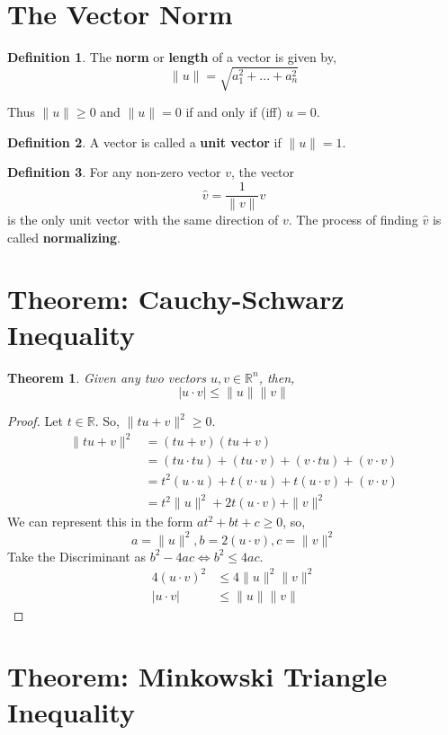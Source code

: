 \documentclass{report}
\newtheorem{_thm}{Theorem}
\theoremstyle{definition}
\newtheorem{_def}{Definition}
\begin{document}
\section{The Vector Norm}

\begin{_def}
The \textbf{norm} or \textbf{length} of a vector is given by,
\[\|u\|=\sqrt{a^2_1+...+a^2_n}\]
\end{_def}

Thus \(\|u\|\geq 0\) and \(\|u\|=0\) if and only if (iff) \(u=0\).

\begin{_def}
A vector is called a \textbf{unit vector} if \(\|u\|=1\).
\end{_def}

\begin{_def}
For any non-zero vector \(v\), the vector 
\[\hat{v}=\frac{1}{\|v\|} v\]
is the only unit vector with the same direction of $v$.
The process of finding \(\hat{v}\) is called \textbf{normalizing}.
\end{_def}

\section{Theorem: Cauchy-Schwarz Inequality}

\begin{_thm}
Given any two vectors \(u,v\in \mathbb{R}^n\), then,
\[|u\cdot v|\leq \|u\|\|v\|\]
\end{_thm}

\begin{proof}
Let \(t\in \mathbb{R}\). So, \(\|tu+v\|^2\geq 0\).
\begin{align*}
\|tu+v\|^2 &= (tu+v)(tu+v) \\
&= (tu\cdot tu)+(tu\cdot v)+(v\cdot tu)+(v\cdot v) \\
&= t^2(u\cdot u)+t(v\cdot u)+t(u\cdot v)+(v\cdot v) \\
&= t^2\|u\|^2+2t(u\cdot v)+\|v\|^2
\end{align*}
We can represent this in the form \(at^2+bt+c\geq 0\), so,
\[a=\|u\|^2, b=2(u\cdot v), c=\|v\|^2\]
Take the Discriminant as \(b^2-4ac\iff b^2\leq 4ac\).
\begin{align*}
4(u\cdot v)^2 &\leq 4\|u\|^2\|v\|^2 \\
|u\cdot v| &\leq \|u\|\|v\|
\end{align*}
\end{proof}

\section{Theorem: Minkowski Triangle Inequality}
\end{document}

